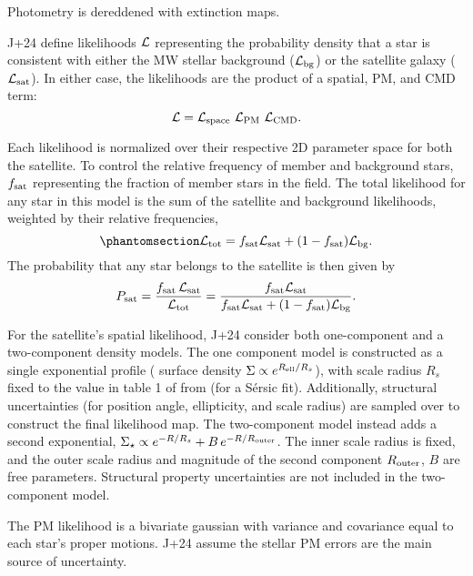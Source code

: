 Photometry is dereddened with \citet{schlegel+finkbeiner+davis1998}
extinction maps.

J+24 define likelihoods \({\cal L}\) representing the probability
density that a star is consistent with either the MW stellar background
(\({\cal L}_{\rm bg}\)) or the satellite galaxy
(\({\cal L}_{\rm sat}\)). In either case, the likelihoods are the
product of a spatial, PM, and CMD term: \begin{equation}{
{\cal L} = {\cal L}_{\rm space}\ {\cal L}_{\rm PM}\ {\cal L}_{\rm CMD}.
}\end{equation}

Each likelihood is normalized over their respective 2D parameter space
for both the satellite. To control the relative frequency of member and
background stars, \(f_{\rm sat}\) representing the fraction of member
stars in the field. The total likelihood for any star in this model is
the sum of the satellite and background likelihoods, weighted by their
relative frequencies,
\begin{equation}\protect\phantomsection\label{eq:Ltot}{
{\cal L}_{\rm tot} = f_{\rm sat}{\cal L}_{\rm sat} + (1-f_{\rm sat}){\cal L}_{\rm bg}.
}\end{equation} The probability that any star belongs to the satellite
is then given by \begin{equation}{
P_{\rm sat} = 
\frac{f_{\rm sat}\,{\cal L}_{\rm sat}}{{\cal L}_{\rm tot}}
= \frac{f_{\rm sat}{\cal L}_{\rm sat}}{f_{\rm sat}{\cal L}_{\rm sat} + (1-f_{\rm sat}){\cal L}_{\rm bg}}.
}\end{equation}

For the satellite's spatial likelihood, J+24 consider both one-component
and a two-component density models. The one component model is
constructed as a single exponential profile ( surface density
\(\Sigma \propto e^{R_{\rm ell} / R_s}\)), with scale radius \(R_s\)
fixed to the value in table 1 of \citet{MV2020a} from \citet{munoz+2018}
(for a Sérsic fit). Additionally, structural uncertainties (for position
angle, ellipticity, and scale radius) are sampled over to construct the
final likelihood map. The two-component model instead adds a second
exponential,
\(\Sigma_\star \propto e^{-R/R_s} + B\,e^{-R/R_{\rm outer}}\). The inner
scale radius is fixed, and the outer scale radius and magnitude of the
second component \(R_{\rm outer}\), \(B\) are free parameters.
Structural property uncertainties are not included in the two-component
model.

The PM likelihood is a bivariate gaussian with variance and covariance
equal to each star's proper motions. J+24 assume the stellar PM errors
are the main source of uncertainty.

